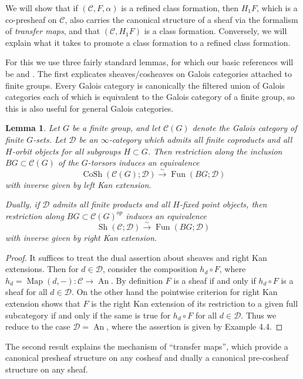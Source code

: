 \documentclass[12pt]{article}
\newtheorem{lemma}[theorem]{Lemma}
\theoremstyle{definition}
\newcommand{\on}{\operatorname}
\newcommand{\mc}{\mathcal}
\begin{document}
We will show that if $(\mc{C},F,\alpha)$ is a refined class formation, then $H_1F$, which is a co-presheaf on $\mc{C}$, also carries the canonical structure of a sheaf via the formalism of \emph{transfer maps}, and that $(\mc{C},H_1F)$ is a class formation. Conversely, we will explain what it takes to promote a class formation to a refined class formation.

For this we use three fairly standard lemmas, for which our basic references will be \cite{cm1} and \cite{cm2}.  The first explicates sheaves/cosheaves on Galois categories attached to finite groups.  Every Galois category is canonically the filtered union of Galois categories each of which is equivalent to the Galois category of a finite group, so this is also useful for general Galois categories.

\begin{lemma}\label{sheafbg}
Let $G$ be a finite group, and let $\mc{C}(G)$ denote the Galois category of finite $G$-sets.  Let $\mc{D}$ be an $\infty$-category which admits all finite coproducts and all $H$-orbit objects for all subgroups $H\subset G$.  Then restriction along the inclusion $BG\subset \mc{C}(G)$ of the $G$-torsors induces an equivalence
$$\on{CoSh}(\mc{C}(G);\mc{D})\overset{\sim}{\rightarrow}\on{Fun}(BG;\mc{D})$$
with inverse given by left Kan extension.

Dually, if $\mc{D}$ admits all finite products and all $H$-fixed point objects, then restriction along $BG\subset \mc{C}(G)^{op}$ induces an equivalence
$$\on{Sh}(\mc{C};\mc{D})\overset{\sim}{\rightarrow}\on{Fun}(BG;\mc{D})$$
with inverse given by right Kan extension.
\end{lemma}
\begin{proof}
It suffices to treat the dual assertion about sheaves and right Kan extensions.  Then for $d\in \mc{D}$, consider the composition $h_d\circ F$, where $h_d = \on{Map}(d,-):\mc{C}\to\on{An}$.  By definition $F$ is a sheaf if and only if $h_d\circ F$ is a sheaf for all $d\in\mc{D}$.  On the other hand the pointwise criterion for right Kan extension shows that $F$ is the right Kan extension of its restriction to a given full subcategory if and only if the same is true for $h_d\circ F$ for all $d\in\mc{D}$.  Thus we reduce to the case $\mc{D}=\on{An}$, where the assertion is given by \cite{cm1} Example 4.4.
\end{proof}

The second result explains the mechanism of ``transfer maps'', which provide a canonical presheaf structure on any cosheaf and dually a canonical pre-cosheaf structure on any sheaf.
\end{document}
